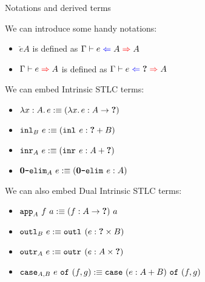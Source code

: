\documentclass{beamer}
\begin{document}
\begin{frame}{Notations and derived terms}

We can introduce some handy notations:

\begin{itemize}
  \item $\check{e}{A}$ is defined as $\hinting{e}{A}{A}$
  \item $\infer{e}{A}$ is defined as $\hinting{e}{\Hole}{A}$
\end{itemize}

We can embed Intrinsic STLC terms:

\begin{itemize}
  \item $\fun{x}[A]{e} :\equiv \annot{\fun{x}{e}}{\Fun{A}{\Hole}}$ \\
  \item $\inl[B]{e} :\equiv \annot{\inl{e}}{\Sum{\Hole}{B}}$ \\
  \item $\inr[A]{e} :\equiv \annot{\inr{e}}{\Sum{A}{\Hole}}$ \\
  \item $\emptyelim[A]{e} :\equiv \annot{\emptyelim{e}}{A}$
\end{itemize}

We can also embed Dual Intrinsic STLC terms:

\begin{itemize}
  \item $\app[A]{f}{a} :\equiv \app{\annot{f}{\Fun{A}{\Hole}}}{a}$
  \item $\outl[B]{e} :\equiv \outl{\annot{e}{\Prod{\Hole}{B}}}$
  \item $\outr[A]{e} :\equiv \outr{\annot{e}{\Prod{A}{\Hole}}}$
  \item $\caseannot{A}{B}{e}{f}{g} :\equiv \case{\annot{e}{\Sum{A}{B}}}{f}{g}$
\end{itemize}

\end{frame}
\end{document}
